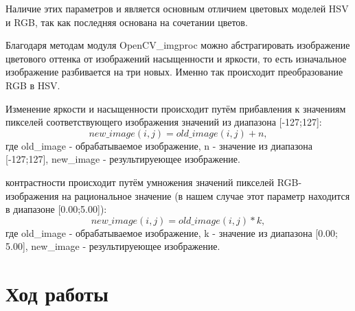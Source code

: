 \documentclass[12pt,a4paper]{scrartcl}
\begin{document}
Наличие этих параметров и является основным отличием цветовых моделей HSV и RGB, так как последняя основана на сочетании цветов.

Благодаря методам модуля OpenCV\_imgproc можно абстрагировать изображение цветового оттенка от изображений насыщенности и яркости, то есть изначальное изображение разбивается на три новых. Именно так происходит преобразование RGB в HSV. 

Изменение яркости и насыщенности происходит путём прибавления к значениям пикселей соответствующего изображения значений из диапазона [-127;127]: \[ new\_image(i,j) = old\_image(i,j) + n, \] где old\_image - обрабатываемое изображение, n - значение из диапазона [-127;127], new\_image - результируеющее изображение.  

 контрастности происходит путём умножения значений пикселей RGB-изображения на рациональное значение (в нашем случае этот параметр находится в диапазоне [0.00;5.00]): \[ new\_image(i,j) = old\_image(i,j) * k, \] где old\_image - обрабатываемое изображение, k - значение из диапазона [0.00; 5.00], new\_image - результируеющее изображение.  


\vfill
\newpage


\section{Ход работы}
\end{document}
